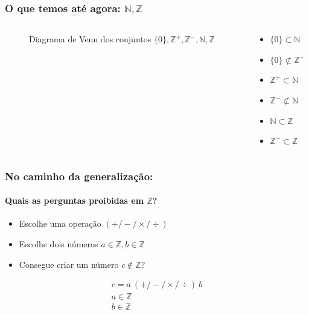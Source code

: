 \documentclass[usenames,dvipsnames,svgnames]{beamer}
\begin{document}
\begin{frame}	
	\frametitle{O que temos até agora: $\mathbb{N}, \mathbb{Z}$}

	\begin{columns}[t]
	\begin{column}{.4\textwidth}
		\begin{figure}
			\def\Zcircle{		(0,0) 			circle (2.5cm)}
			\def\Ncircle{		(1.25cm:-1.25cm) circle (1.1cm)}
			\def\Zminuscircle{	(1.25cm:1.25cm) circle (1.1cm)}
			\def\Zpluscircle{	(1cm:-1.75cm) circle (0.5cm)}
			\def\zerocircle{	(1.5cm:-0.75cm) circle (0.5cm)}

			\caption{Diagrama de Venn dos conjuntos $\{0\}, \mathbb{Z}^{+}, \mathbb{Z}^{-}, \mathbb{N}, \mathbb{Z}$}
		\end{figure}
	\end{column}
	\begin{column}{.6\textwidth}
		\begin{itemize}
			\item $\{0\} \subset \mathbb{N}$
			\item $\{0\} \not\subset \mathbb{Z}^{+}$
			\item $\mathbb{Z}^{+} \subset \mathbb{N}$
			\item $\mathbb{Z}^{-} \not\subset \mathbb{N}$
			\item $\mathbb{N} \subset \mathbb{Z}$
			\item $\mathbb{Z}^{-} \subset \mathbb{Z}$
		\end{itemize}
	\end{column}
	\end{columns}
\end{frame}

\begin{frame}	
	\frametitle{No caminho da generalização:}
	\framesubtitle{Quais as perguntas proibidas em $\mathbb{Z}$?}

	\begin{itemize}
		\item Escolhe uma operação $(+ / - / \times / \div)$
		\item Escolhe dois números $a \in \mathbb{Z}, b \in \mathbb{Z}$
		\item Consegue criar um número $c \not \in \mathbb{Z}$?
	\end{itemize}

	\begin{equation}
	\begin{aligned}
		c = a ~ (+ / - / \times / \div) ~ b \\
		a \in \mathbb{Z} \\
		b \in \mathbb{Z}
	\end{aligned}
	\end{equation}
\end{frame}
\end{document}
